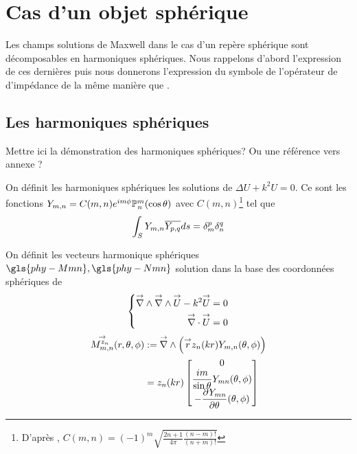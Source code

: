 \section{Cas d'un objet sphérique}

    Les champs solutions de Maxwell dans le cas d'un repère sphérique sont décomposables en harmoniques sphériques. Nous rappelons d'abord l’expression de ces dernières puis nous donnerons l'expression du symbole de l'opérateur de d'impédance de la même manière que \cite{cheng_spectral_1993}.

    \subsection{Les harmoniques sphériques}

        \begin{TODO}
          Mettre ici la démonstration des harmoniques sphériques? Ou une référence vers annexe ?
        \end{TODO}

        On définit les harmoniques sphériques les solutions de \(\Delta U + k^2 U = 0 \). Ce sont les fonctions \(Y_{m,n} = C(m,n) e^{im\phi}\mathbb{P}^m_n(\cos \theta) \) avec \(C(m,n)\)\footnote{D’après \cite[p.~24]{nedelec_acoustic_2001}, \( C(m,n) = (-1)^m\sqrt{\frac{2n+1}{4\pi}\frac{(n-m)!}{(n+m)!}}\)} tel que
        \[
         \displaystyle\int_S Y_{m,n} {\overline{Y_{p,q}}} ds = \delta_m^p \delta_n^q
        \]


        On définit les vecteurs harmonique sphériques\(\gls{phy-Mmn} ,\gls{phy-Nmn}\) solution dans la base des coordonnées sphériques de
        \[
            \left\lbrace
                \begin{aligned}
                    {\overset{\rightarrow}{\nabla}}\wedge {\overset{\rightarrow}{\nabla}}\wedge {\overset{\rightarrow}{U}} - k^2 {\overset{\rightarrow}{U}} = 0\\
                    {\overset{\rightarrow}{\nabla}}\cdot {\overset{\rightarrow}{U}} = 0
                \end{aligned}
            \right.
        \]
        \begin{align}
            \label{eq:defMmn}
            \Mmn[z_n](\rtp) &:= \vrot \left( \vect{r} z_n(kr) Y_{m,n}(\tp) \right)\\
            &= z_n(kr)
            \begin{bmatrix}
                0
                \\
                \frac{im}{\sin\theta}Y_{mn}(\tp)
                \\
                - \ddr{\theta}{Y_{mn}}(\tp)
            \end{bmatrix}
        \end{align}

